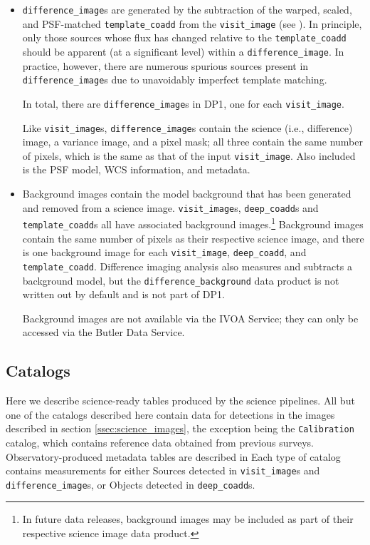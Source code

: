\begin{itemize}
\item \texttt{difference\_image}s \citep{10.71929/rubin/2570312} are generated by the subtraction of the warped, scaled, and \gls{PSF}-matched \texttt{template\_coadd} from the \texttt{visit\_image} (see ). In principle, only those sources whose \gls{flux} has changed relative to the \texttt{template\_coadd} should be apparent (at a significant level) within a \texttt{difference\_image}. In practice, however, there are numerous spurious sources present in \texttt{difference\_image}s due to unavoidably imperfect template matching.

In total, there are \ndifferenceimages \texttt{difference\_image}s in \gls{DP1}, one for each \texttt{visit\_image}.

Like \texttt{visit\_image}s, \texttt{difference\_image}s contain the science (i.e., difference) image, a variance image, and a pixel mask; all three contain the same number of pixels, which is the same as that of the input \texttt{visit\_image}. 
Also included is the \gls{PSF} model, \gls{WCS} information, and \gls{metadata}.

\item Background images contain the model \gls{background} that has been generated and removed from a science image.
\texttt{visit\_image}s, \texttt{deep\_coadd}s and \texttt{template\_coadd}s all have associated \gls{background} images.\footnote{In future data releases, \gls{background} images may be included as part of their respective science image data product.} Background images contain the same number of pixels as their respective science image, and there is one \gls{background} image for each \texttt{visit\_image}, \texttt{deep\_coadd}, and \texttt{template\_coadd}.
Difference imaging analysis also measures and subtracts a \gls{background} model, but the \texttt{difference\_background} data product is not written out by default and is not part of \gls{DP1}.

Background images are not available via the \gls{IVOA} Service; they can only be accessed via the \gls{Butler} Data Service.
\end{itemize}

\subsection{Catalogs}
\label{ssec:catalogs}
Here we describe science-ready tables produced by the science pipelines.
All but one of the catalogs described here contain data for detections in the images described in section \ref{ssec:science_images}, the exception being the \texttt{Calibration} catalog, which contains reference data obtained from previous surveys.
Observatory-produced \gls{metadata} tables are described in 
Each type of catalog contains measurements for either Sources  detected in  \texttt{visit\_image}s and \texttt{difference\_image}s, or Objects detected in \texttt{deep\_coadd}s.

